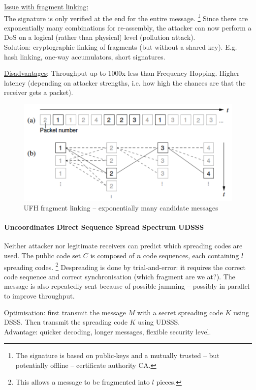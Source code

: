 \underline{Issue with fragment linking:} \\
The signature is only verified at the end for the entire message.%
\footnote{The signature is based on public-keys and a mutually trusted -- but potentially offline -- certificate authority CA.}
Since there are exponentially many combinations for re-assembly, the attacker can now perform a DoS on a logical (rather than physical) level (pollution attack).
\\
Solution: cryptographic linking of fragments (but without a shared key).
E.g. hash linking, one-way accumulators, short signatures.

\underline{Disadvantages}:
Throughput up to 1000x less than Frequency Hopping.
Higher latency (depending on attacker strengths, i.e. how high the chances are that the receiver gets a packet).

\begin{figure}[h]
	\centering
	\includegraphics[scale=0.4]{images/3-ufh-fragment-linking.png}
	\caption{UFH fragment linking -- exponentially many candidate messages}
	\label{fig:ufh-fragment-linking}
\end{figure}

\paragraph{Uncoordinates Direct Sequence Spread Spectrum UDSSS}
Neither attacker nor legitimate receivers can predict which spreading codes are used.
The public code set $C$ is composed of $n$ code sequences, each containing $l$ spreading codes.%
\footnote{This allows a message to be fragmented into $l$ pieces.}
Despreading is done by trial-and-error: it requires the correct code sequence and correct synchronisation (which fragment are we at?).
The message is also repeatedly sent because of possible jamming -- possibly in parallel to improve throughput.

\underline{Optimisation}: first transmit the message $M$ with a secret spreading code $K$ using DSSS.
Then transmit the spreading code $K$ using UDSSS.
\\
Advantage: quicker decoding, longer messages, flexible security level.



